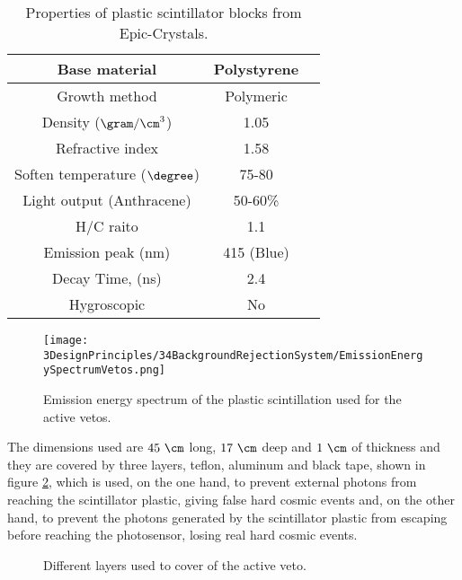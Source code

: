 \begin{table}[htbp]
\begin{center}
\begin{tabular}{|c|c|c|}
\hline \hline 
Base material & Polystyrene \\ \hline
Growth method & Polymeric \\ \hline
Density ($\gram/\cm^3$)& 1.05 \\ \hline
Refractive index & 1.58 \\ \hline
Soften temperature ($\degree$) & 75-80 \\ \hline
Light output (Anthracene) & 50-60\% \\ \hline
H/C raito & 1.1 \\ \hline
Emission peak (nm) & 415 (Blue) \\ \hline
Decay Time, (ns) & 2.4 \\ \hline
Hygroscopic & No \\ \hline
\end{tabular}
\caption{Properties of plastic scintillator blocks from Epic-Crystals. \cite{ScintillatorVeto}}
\label{tab:ParametersScintillatorVeto}
\end{center}
\end{table}

\begin{figure}[]
\centering
\texttt{[image: 3DesignPrinciples/34BackgroundRejectionSystem/EmissionEnergySpectrumVetos.png]}
\caption{Emission energy spectrum of the plastic scintillation used for the active vetos.\label{fig:EmissionEnergySpectrumVeto}~\cite{ScintillatorVeto}}
\end{figure}

The dimensions used are $45~\cm$ long, $17~\cm$ deep and $1~\cm$ of thickness and they are covered by three layers, teflon, aluminum and black tape, shown in figure \ref{fig:LayersVeto}, which is used, on the one hand, to prevent external photons from reaching the scintillator plastic, giving false hard cosmic events and, on the other hand, to prevent the photons generated by the scintillator plastic from escaping before reaching the photosensor, losing real hard cosmic events.

\begin{figure}[]
 \centering
 \caption{Different layers used to cover of the active veto.}
 \label{fig:LayersVeto}
\end{figure}

